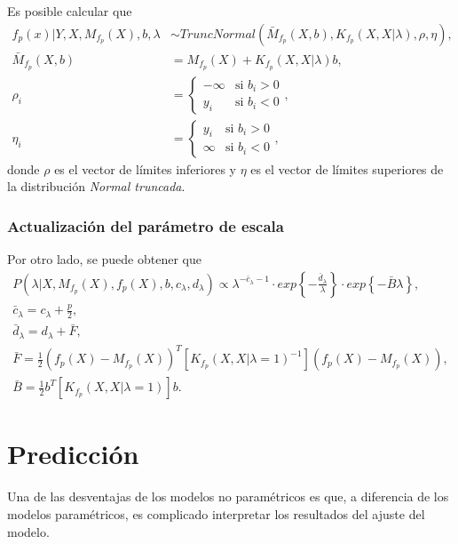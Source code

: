 Es posible calcular que
\begin{equation*}
\begin{aligned}
   f_p(x)|Y,X,M_{f_p}(X),b,\lambda &\sim TruncNormal(\bar{M}_{f_p}(X,b), K_{f_p}(X,X|\lambda), \rho, \eta), \\
   \bar{M}_{f_p}(X,b) &= M_{f_p}(X) + K_{f_p}(X,X|\lambda)b, \\
   \rho_i &= 
   \begin{cases}
    -\infty & \text{si }b_i > 0 \\
    y_i & \text{si }b_i < 0
   \end{cases},\\
   \eta_i &= 
   \begin{cases}
    y_i & \text{si }b_i > 0 \\
    \infty & \text{si }b_i < 0
   \end{cases},
\end{aligned}
\end{equation*}
donde $\rho$ es el vector de l\'imites inferiores y $\eta$ es el vector de l\'imites superiores de la distribuci\'on \textit{Normal truncada}.

\subsubsection{Actualizaci\'on del par\'ametro de escala}

Por otro lado, se puede obtener que
\begin{equation*}
\begin{gathered}
   P(\lambda|X,M_{f_p}(X),f_p(X),b,c_\lambda,d_\lambda) 
   \propto
   \lambda^{-\bar{c}_\lambda-1}
   \cdot
   exp\left\{- \frac{\bar{d}_\lambda}{\lambda}\right\}
   \cdot
   exp\left\{-\bar{B} \lambda\right\}, \\
   \bar{c}_\lambda = c_\lambda + \frac{p}{2}, \\
   \bar{d}_\lambda = d_\lambda + \bar{F}, \\
   \bar{F} = \frac{1}{2}(f_p(X)-M_{f_p}(X))^T [K_{f_p}(X,X|\lambda=1)^{-1}] (f_p(X)-M_{f_p}(X)), \\
   \bar{B} = \frac{1}{2}b^T [K_{f_p}(X,X|\lambda=1)] b.
\end{gathered}
\end{equation*}

\section{Predicci\'on}

Una de las desventajas de los modelos no param\'etricos es que, a diferencia de los modelos param\'etricos, es complicado interpretar los resultados del ajuste del modelo.

